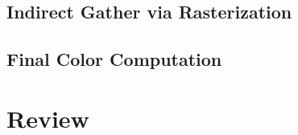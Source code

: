\subsection{Indirect Gather via Rasterization}

\subsection{Final Color Computation}

\section{Review}

